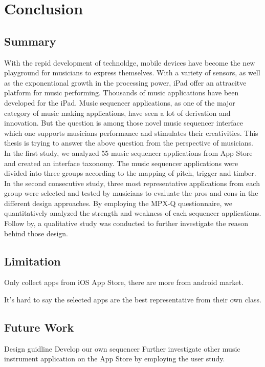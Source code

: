 \pagestyle{fancy}
\rhead{\thepage}
\chapter{Conclusion}
\label{ch: chapter 5}
\section{Summary}

With the repid development of technoldge, mobile devices have become the new playground for musicians to express themselves. With a variety of sensors, as well as the exponentional growth in the processing power, iPad offer an attracitve platform for music performing. Thousands of music applications have been developed for the iPad. Music sequencer applications, as one of the major category of music making applications, have seen a lot of derivation and innovation. But the question is among those novel music sequencer interface which one supports musicians performance and stimulates their creativities. This thesis is trying to answer the above question from the perspective of musicians. In the first study, we analyzed 55 music sequencer applications from App Store and created an interface taxonomy. The music sequencer applications were divided into three groups according to the mapping of pitch, trigger and timber. In the second consecutive study, three most representative applications from each group were selected and tested by musicians to evaluate the pros and cons in the different design approaches. By employing the MPX-Q questionnaire, we quantitatively analyzed the strength and weakness of each sequencer applications. Follow by, a qualitative study was conducted to further investigate the reason behind those design.

\section{Limitation}

Only collect apps from iOS App Store, there are more from android market.

It's hard to say the selected apps are the best representative from their own class.



\section{Future Work}

Design guidline
Develop our own sequencer
Further investigate other music instrument application on the App Store by employing the user study.


\clearpage
